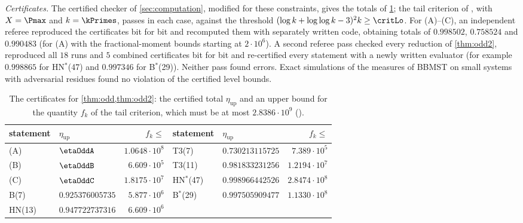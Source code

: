 \emph{Certificates.} The certified checker of \cref{sec:computation}, modified for these constraints, gives the totals
of \cref{tab:odd}; the tail criterion of \cite[Theorem~6.1]{BBMST}, with $X=\Pmax$ and $k=\kPrimes$, passes in each
case, against the threshold $(\log k+\log\log k-3)^2k\ge\critLo$. For (A)--(C), an independent referee reproduced the
certificates bit for bit and recomputed them with separately written code, obtaining totals of $0.998502$, $0.758524$
and $0.990483$ (for (A) with the fractional-moment bounds starting at $2\cdot10^6$). A second referee pass checked every
reduction of \cref{thm:odd2}, reproduced all $18$ runs and $5$ combined certificates bit for bit and re-certified every
statement with a newly written evaluator (for example $0.998865$ for HN$^*$(47) and $0.997346$ for B$^*$(29)). Neither
pass found errors. Exact simulations of the measures of BBMST on small systems with adversarial residues found no
violation of the certified level bounds.

\begin{table}[ht]
\centering
\caption{The certificates for \cref{thm:odd,thm:odd2}: the certified total $\eta_{\mathrm{up}}$ and an upper bound for
the quantity $f_k$ of the tail criterion, which must be at most $2.8386\cdot10^9$
().}
\label{tab:odd}
\small
\begin{tabular}{@{}llr@{\qquad}llr@{}}
\toprule
statement & $\eta_{\mathrm{up}}$ & $f_k\le$ & statement & $\eta_{\mathrm{up}}$ & $f_k\le$\\
\midrule
(A) & $\etaOddA$ & $1.0648\cdot10^8$ & T3(7) & $0.730213115725$ & $7.389\cdot10^5$\\
(B) & $\etaOddB$ & $6.609\cdot10^5$ & T3(11) & $0.981833231256$ & $1.2194\cdot10^7$\\
(C) & $\etaOddC$ & $1.8175\cdot10^7$ & HN$^*$(47) & $0.998966442526$ & $2.8474\cdot10^8$\\
B(7) & $0.925376005735$ & $5.877\cdot10^6$ & B$^*$(29) & $0.997505909477$ & $1.1330\cdot10^8$\\
HN(13) & $0.947722737316$ & $6.609\cdot10^6$ & & &\\
\bottomrule
\end{tabular}
\end{table}

